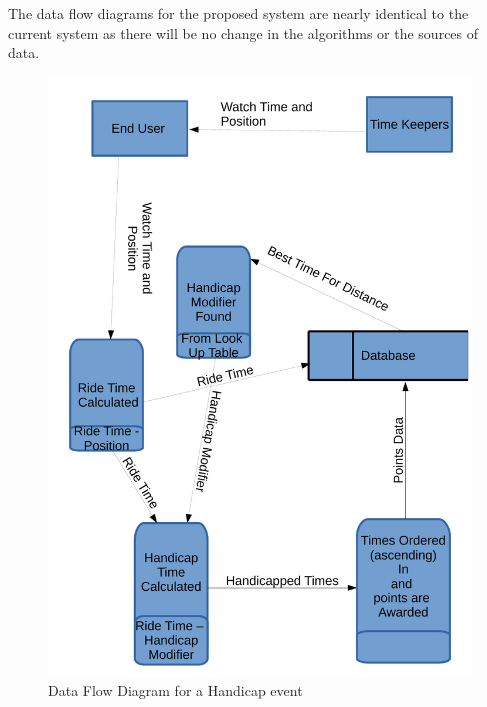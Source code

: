 The data flow diagrams for the proposed system are nearly identical to the current system as there will be no change in the algorithms or the sources of data.
\begin{figure}[H]
	\includegraphics[width=\textwidth]{./DFDPS.pdf}
	 \caption{Data Flow Diagram for a Handicap event}
\end{figure}


